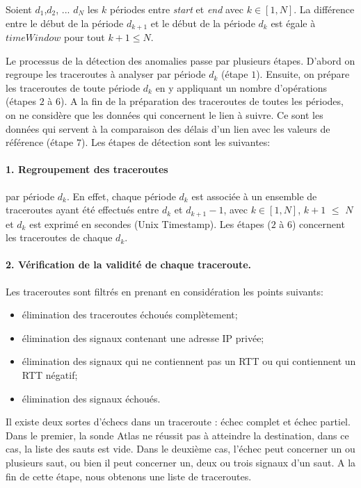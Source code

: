 Soient $ d_1 $,$  d_2 $, ... $ d_N $ les $k$ périodes entre \textit{start} et \textit{end} avec $k \in [1,N]$. La différence entre le début de la période $ d_{k+1} $ et le début de la période $ d_k $ est égale à $timeWindow$ pour tout $k+1 \leq N $.  

  Le processus de la détection des anomalies passe par plusieurs étapes. D'abord on  regroupe les traceroutes à analyser par période $d_k$ (étape $ 1 $). Ensuite, on prépare les traceroutes de toute  période $d_k$ en y appliquant un nombre d'opérations (étapes  $ 2 $ à $ 6 $). A la fin de la préparation des traceroutes de toutes les périodes, on ne considère que les données qui concernent le lien à suivre. Ce sont les données qui servent à la comparaison  des  délais d'un lien avec les valeurs de référence (étape $ 7 $). Les étapes de détection sont les suivantes:

\paragraph{1. Regroupement des traceroutes } par période $d_k$. En effet, chaque période $d_k$ est associée à un ensemble de traceroutes ayant été effectués entre $d_k$ et $d_{k+1} - 1 $, avec $k \in [1,N]$, $k+1$ $\leq$ $N $ et  $d_k$ est exprimé en secondes (Unix Timestamp). Les étapes  ($ 2 $ à $ 6 $) concernent  les traceroutes de chaque $d_k$.  

\paragraph{2. Vérification de la validité de chaque traceroute.} 
Les traceroutes sont filtrés en prenant en considération  les points suivants:
\begin{itemize}
	\item élimination des traceroutes échoués complètement;
	\item élimination des signaux contenant une adresse IP privée;
	\item élimination des signaux qui ne contiennent pas un RTT ou  qui contiennent un RTT négatif;
	\item  élimination des signaux échoués.
\end{itemize}

Il existe deux sortes d'échecs dans un traceroute : échec complet et échec partiel. Dans le premier,   la sonde Atlas ne réussit pas à atteindre la destination, dans ce cas, la liste des sauts est vide. Dans le deuxième cas, l'échec peut concerner un ou plusieurs saut, ou bien il peut concerner un, deux ou trois signaux d'un saut. A la fin de cette étape, nous obtenons une liste de traceroutes.


